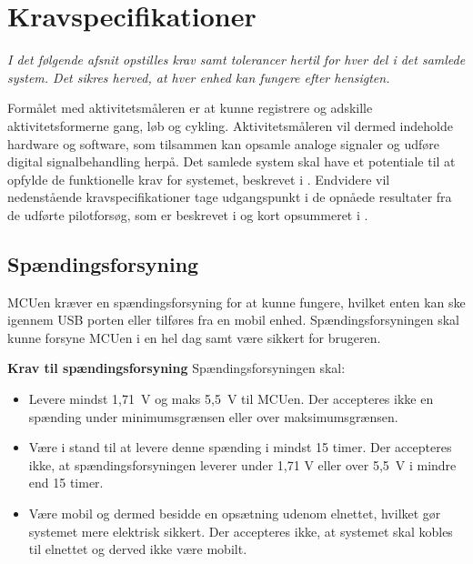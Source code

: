 \section{Kravspecifikationer}\label{Sec:krav}
\textit{I det følgende afsnit opstilles krav samt tolerancer hertil for hver del i det samlede system. Det sikres herved, at hver enhed kan fungere efter hensigten.}

Formålet med aktivitetsmåleren er at kunne registrere og adskille aktivitetsformerne gang, løb og cykling. Aktivitetsmåleren vil dermed indeholde hardware og software, som tilsammen kan opsamle analoge signaler og udføre digital signalbehandling herpå. Det samlede system skal have et potentiale til at opfylde de funktionelle krav for systemet, beskrevet i . Endvidere vil nedenstående kravspecifikationer tage udgangspunkt i de opnåede resultater fra de udførte pilotforsøg, som er beskrevet i  og kort opsummeret i .
%

\subsection{Spændingsforsyning} \label{krav_spaendingsf}
MCUen kræver en spændingsforsyning for at kunne fungere, hvilket enten kan ske igennem USB porten eller tilføres fra en mobil enhed. Spændingsforsyningen skal kunne forsyne MCUen i en hel dag samt være sikkert for brugeren. %

\textbf{Krav til spændingsforsyning} \newline 
Spændingsforsyningen skal:
\begin{itemize}
	\item Levere mindst 1,71~V og maks 5,5~V til MCUen. Der accepteres ikke en spænding under minimumsgrænsen eller over maksimumsgrænsen. %
	\item Være i stand til at levere denne spænding i mindst 15 timer. Der accepteres ikke, at spændingsforsyningen leverer under 1,71 V eller over 5,5~V i mindre end 15 timer.
	\item Være mobil og dermed besidde en opsætning udenom elnettet, hvilket gør systemet mere elektrisk sikkert. Der accepteres ikke, at systemet skal kobles til elnettet og derved ikke være mobilt.
\end{itemize}

